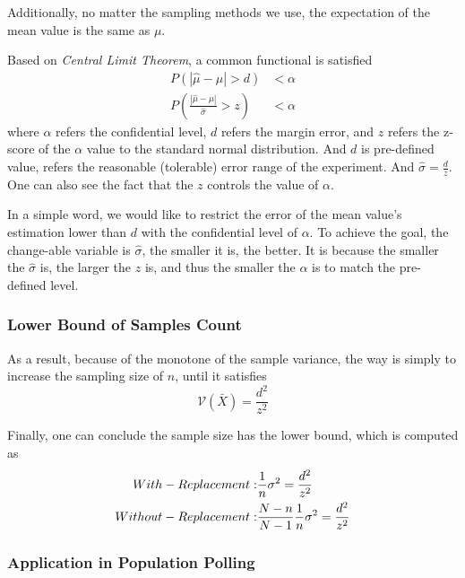 Additionally,
no matter the sampling methods we use, the expectation of the mean value is the same as $\mu$.

Based on \emph{Central Limit Theorem}, a common functional is satisfied
\begin{align*}
    P(|\hat{\mu}-\mu| > d)                      & < \alpha \\
    P(\frac{|\hat{\mu}-\mu|}{\hat{\sigma}} > z) & < \alpha
\end{align*}
where $\alpha$ refers the confidential level, $d$ refers the margin error, and $z$ refers the z-score of the $\alpha$ value to the standard normal distribution.
And $d$ is pre-defined value, refers the reasonable (tolerable) error range of the experiment.
And $\hat{\sigma} = \frac{d}{z}$.
One can also see the fact that the $z$ controls the value of $\alpha$.

In a simple word, we would like to restrict the error of the mean value's estimation lower than $d$ with the confidential level of $\alpha$.
To achieve the goal, the change-able variable is $\hat{\sigma}$, the smaller it is, the better.
It is because the smaller the $\hat{\sigma}$ is, the larger the $z$ is, and thus the smaller the $\alpha$ is to match the pre-defined level.

\subsubsection{Lower Bound of Samples Count}

As a result,
because of the monotone of the sample variance,
the way is simply to increase the sampling size of $n$, until it satisfies
\begin{equation*}
    \mathcal{V}(\bar{X}) = \frac{d^2}{z^2}
\end{equation*}

Finally, one can conclude the sample size has the lower bound, which is computed as
\begin{align}
    With-Replacement:    & \space \frac{1}{n} \sigma^2 = \frac{d^2}{z^2}                 \\
    Without-Replacement: & \space \frac{N-n}{N-1} \frac{1}{n} \sigma^2 = \frac{d^2}{z^2}
\end{align}

\subsubsection{Application in Population Polling}

